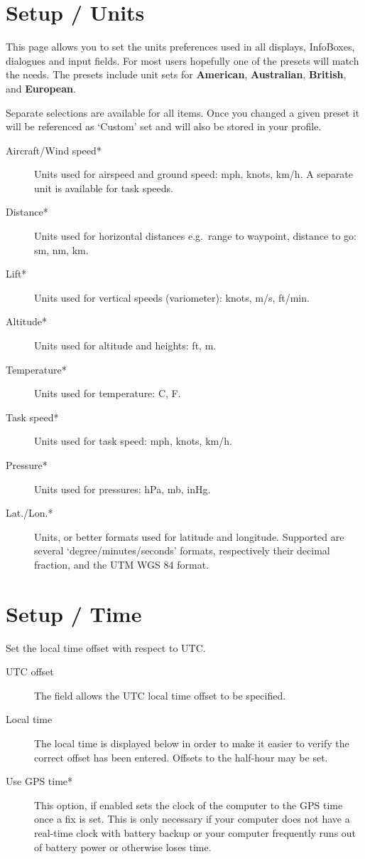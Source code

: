 \section{Setup / Units}

This page allows you to set the units preferences used in all
displays, InfoBoxes, dialogues and input fields.  
For most users hopefully one of the presets will match the needs.  The presets 
include unit sets for {\bf American}, {\bf Australian}, {\bf British}, 
and {\bf European}.

Separate selections are available for all items. Once you changed a given preset it 
will be referenced as `Custom' set and will also be stored in your profile.

\begin{description}
\item[Aircraft/Wind speed*]  Units used for airspeed and ground speed: mph, 
  knots, km/h. A separate unit is available for task speeds.
\item[Distance*]  Units used for horizontal distances e.g.\ range to waypoint,
  distance to go: sm, nm, km.
\item[Lift*]  Units used for vertical speeds (variometer): knots, m/s, ft/min.
\item[Altitude*] Units used for altitude and heights: ft, m.
\item[Temperature*]  Units used for temperature: \degree C, \degree F.
\item[Task speed*] Units used for task speed: mph, knots, km/h.
\item[Pressure*]  Units used for pressures: hPa, mb, inHg.
\item[Lat./Lon.*]  Units, or better formats used for latitude and longitude. 
  Supported are several `degree/minutes/seconds' formats, respectively 
  their decimal fraction, and the  UTM WGS 84 format.
\end{description}


\section{Setup / Time}

Set the local time offset with respect to UTC.

\begin{description}
\item[UTC offset]  The field allows the UTC local time offset to be specified.
\item[Local time]  The local time is displayed below in order to make it easier to verify
  the correct offset has been entered.  Offsets to the half-hour may be set.
\item[Use GPS time*] This option, if enabled sets the clock of the computer to 
  the GPS time once a fix is set. This is only necessary if your computer does 
  not have a real-time clock with battery backup or your computer 
  frequently runs out of battery power or otherwise loses time.
\end{description}


